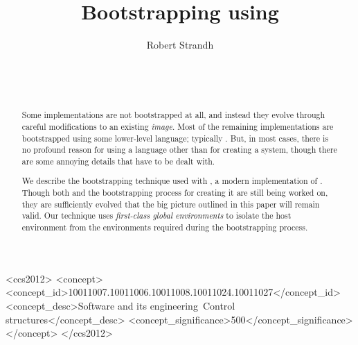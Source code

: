 \documentclass{sig-alternate-05-2015}
\def\inputtex#1{}
\begin{document}
\title{Bootstrapping \commonlisp{} using \commonlisp{}}
\author{\alignauthor
Robert Strandh\\
\\
\\
\\
}


\maketitle

\begin{abstract}
Some \commonlisp{} implementations are not bootstrapped at all, and
instead they evolve through careful modifications to an existing
\emph{image}.  Most of the remaining implementations are bootstrapped
using some lower-level language; typically \clanguage{}.  But, in most
cases, there is no profound reason for using a language other than
\commonlisp{} for creating a \commonlisp{} system, though there are
some annoying details that have to be dealt with.

We describe the bootstrapping technique used with \sicl{}, a modern
implementation of \commonlisp{}.  Though both \sicl{} and the
bootstrapping process for creating it are still being worked on, they
are sufficiently evolved that the big picture outlined in this paper
will remain valid.  Our technique uses \emph{first-class global
  environments} to isolate the host environment from the environments
required during the bootstrapping process.
\end{abstract}

\begin{CCSXML}
  <ccs2012>
  <concept>
  <concept_id>10011007.10011006.10011008.10011024.10011027</concept_id>
  <concept_desc>Software and its engineering~Control structures</concept_desc>
  <concept_significance>500</concept_significance>
  </concept>
  </ccs2012>
\end{CCSXML}


\printccsdesc


\inputtex{sec-introduction.tex}
\inputtex{sec-previous.tex}
\inputtex{sec-our-method.tex}
\inputtex{sec-benefits.tex}
\inputtex{sec-conclusions.tex}
\inputtex{sec-acknowledgments.tex}



\end{document}

